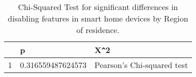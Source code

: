 \begin{table}[ht]
\centering
\begin{tabular}{rll}
  \hline
 & p & X\verb|^|2 \\ 
  \hline
1 & 0.316559487624573 & Pearson's Chi-squared test \\ 
   \hline
\end{tabular}
\caption{Chi-Squared Test for significant differences in disabling features in smart home devices by Region of residence.} 
\end{table}
